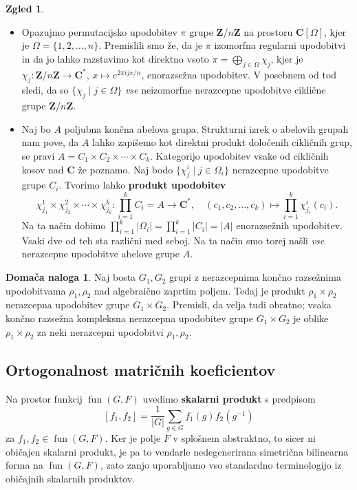 \documentclass[11pt]{book}
\def\ZZ{\mathbf{Z}}
\def\CC{\mathbf{C}}
\DeclareMathOperator\fun{fun}
\def\definicija{\color{rdeca}\bf}
\theoremstyle{definition}
\theoremstyle{zgled}
\newtheorem{zgled}[theorem]{Zgled}
\theoremstyle{zgledbrezstevilke}
\theoremstyle{odprtproblem}
\theoremstyle{domacanaloga}
\newtheorem{domacanaloga}[theorem]{Domača naloga}
\theoremstyle{izrek}
\begin{document}
\begin{zgled} \leavevmode
\begin{itemize}
    \item Opazujmo permutacijsko upodobitev $\pi$ grupe $\ZZ/n\ZZ$ na prostoru $\CC[\Omega]$, kjer je $\Omega = \{ 1, 2, \dots, n \}$. Premislili smo že, da je $\pi$ izomorfna regularni upodobitvi in da jo lahko razstavimo kot direktno vsoto $\pi = \bigoplus_{j \in \Omega} \chi_j$, kjer je $\chi_j \colon \ZZ/n\ZZ \to \CC^*$, $x \mapsto e^{2 \pi i j x / n}$, enorazsežna upodobitev. V posebnem od tod sledi, da so $\{ \chi_j \mid j \in \Omega \}$ \emph{vse} neizomorfne nerazcepne upodobitve ciklične grupe $\ZZ/n\ZZ$.

    \item Naj bo $A$ poljubna končna abelova grupa. Strukturni izrek o abelovih grupah nam pove, da $A$ lahko zapišemo kot direktni produkt določenih cikličnih grup, se pravi $A = C_1 \times C_2 \times \cdots \times C_k$. Kategorijo upodobitev vsake od cikličnih kosov nad $\CC$ že poznamo. Naj bodo $\{ \chi^i_j \mid j \in \Omega_i \}$ nerazcepne upodobitve grupe $C_i$. Tvorimo lahko {\definicija produkt upodobitev}
    \[
        \chi^1_{j_1} \times \chi^2_{j_2} \times \cdots \times \chi^k_{j_k} \colon \prod_{i=1}^k C_i = A \to \CC^*, \quad
        (c_1, c_2, \dots, c_k) \mapsto \prod_{i = 1}^k \chi^i_{j_i}(c_i).
    \]
    Na ta način dobimo $\prod_{i=1}^k |\Omega_i| = \prod_{i=1}^k |C_i| = |A|$ enorazsežnih upodobitev. Vsaki dve od teh sta različni med seboj. Na ta način smo torej našli \emph{vse} nerazcepne upodobitve abelove grupe $A$.
\end{itemize}
\end{zgled}

\begin{domacanaloga}
Naj bosta $G_1, G_2$ grupi z nerazcepnima končno razsežnima upodobitvama $\rho_1, \rho_2$ nad algebraično zaprtim poljem. Tedaj je produkt $\rho_1 \times \rho_2$ nerazcepna upodobitev grupe $G_1 \times G_2$. Premisli, da velja tudi obratno; vsaka končno razsežna kompleksna nerazcepna upodobitev grupe $G_1 \times G_2$ je oblike $\rho_1 \times \rho_2$ za neki nerazcepni upodobitvi $\rho_1, \rho_2$.
\end{domacanaloga}

\subsection{Ortogonalnost matričnih koeficientov}

Na prostor funkcij $\fun(G,F)$ uvedimo {\definicija skalarni produkt} s predpisom
\[
    [ f_1, f_2 ] = \frac{1}{|G|} \sum_{g \in G} f_1(g) f_2(g^{-1})
\]
za $f_1, f_2 \in \fun(G,F)$. Ker je polje $F$ v splošnem abstraktno, to sicer ni običajen skalarni produkt, je pa to vendarle nedegenerirana simetrična bilinearna forma na $\fun(G,F)$, zato zanjo uporabljamo vso standardno terminologijo iz običajnih skalarnih produktov.
\end{document}
